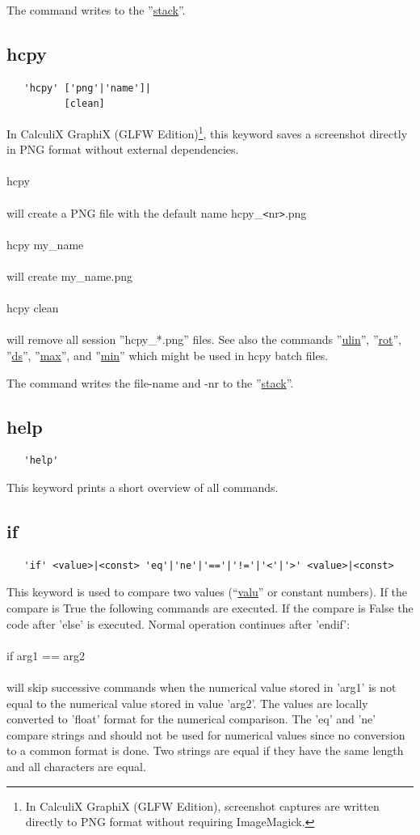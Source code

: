 \documentclass{article}
\providecommand{\htmlref}[2]{\hyperref[#2]{#1}}
\begin{document}
The command writes to the ''\htmlref{stack}{stack}''.

\subsection{\label{hcpy}hcpy}
\begin{verbatim}
   'hcpy' ['png'|'name']|
          [clean]
\end{verbatim}
In CalculiX GraphiX (GLFW Edition)\footnote{In CalculiX GraphiX (GLFW Edition), screenshot captures are written directly to PNG format without requiring ImageMagick.}, this keyword saves a screenshot directly in PNG format without external dependencies.\\\\hcpy\\\\will create a PNG file with the default name hcpy\_\verb_<_nr\verb_>_.png\\\\hcpy my\_name\\\\will create my\_name.png\\\\hcpy clean\\\\will remove all session ''hcpy\_*.png'' files. See also the commands ''\htmlref{ulin}{ulin}'', ''\htmlref{rot}{rot}'', ''\htmlref{ds}{ds}'', ''\htmlref{max}{max}'', and ''\htmlref{min}{min}'' which might be used in hcpy batch files.

The command writes the file-name and -nr to the ''\htmlref{stack}{stack}''.

\subsection{\label{help}help}
\begin{verbatim}
   'help'
\end{verbatim}
This keyword prints a short overview of all commands.

\subsection{\label{if}if}
\begin{verbatim}
   'if' <value>|<const> 'eq'|'ne'|'=='|'!='|'<'|'>' <value>|<const>
\end{verbatim}
This keyword is used to compare two values (``\htmlref{valu}{valu}'' or constant numbers). If the compare is True the following commands are executed. If the compare is False the code after 'else' is executed. Normal operation continues after 'endif':
\\\\if arg1 == arg2\\\\will skip successive commands when the numerical value stored in 'arg1' is not equal to the numerical value stored in value 'arg2'. The values are locally converted to 'float' format for the numerical comparison. The 'eq' and 'ne' compare strings and should not be used for numerical values since no conversion to a common format is done. Two strings are equal if they have the same length and all characters are equal.
\end{document}
